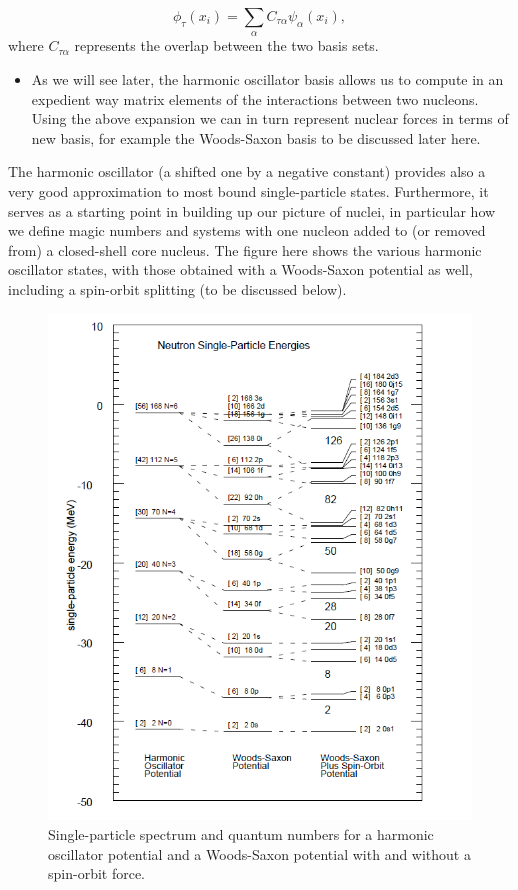 \documentclass[%
oneside,                 %
final,                   %
10pt]{article}
\begin{document}
\noindent
\[
\phi_{\tau}(x_i)=\sum_{\alpha} C_{\tau\alpha}\psi_{\alpha}(x_i),
\]
where $C_{\tau\alpha}$ represents the overlap between the two basis sets. 
\begin{itemize}
 \item As we will see later, the harmonic oscillator basis allows us to compute in an expedient way matrix elements of the interactions between two nucleons.  Using the above expansion we can in turn represent nuclear forces in terms of new basis, for example the  Woods-Saxon basis  to be discussed later here.
\end{itemize}

\noindent
The harmonic oscillator (a shifted one by a negative constant) provides also a very good approximation to most bound single-particle states. Furthermore, it serves as a starting point in building up our picture of nuclei, in particular how we define magic numbers and systems with one nucleon added to (or removed from) a closed-shell core nucleus. The figure here shows 
the various harmonic oscillator states, with those obtained with a Woods-Saxon potential as well, including a spin-orbit splitting (to be discussed below).

\begin{figure}[t]
  \centerline{\includegraphics[width=0.6\linewidth]{fig-intro/singleparticle.png}}
  \caption{
  Single-particle spectrum and quantum numbers for a harmonic oscillator potential and a Woods-Saxon potential with and without a spin-orbit force.
  }
\end{figure}
\end{document}
